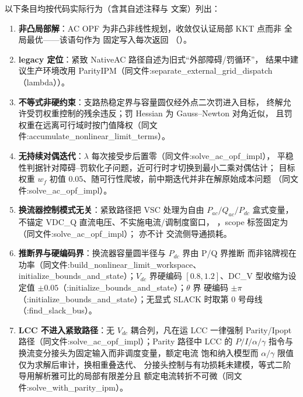 以下条目均按代码实际行为（含其自述注释与  文案）列出：
\begin{enumerate}
  \item \textbf{非凸局部解}：AC OPF 为非凸非线性规划，收敛仅认证局部 KKT 点而非
        全局最优——该语句作为  固定写入每次返回
        （）。
  \item \textbf{legacy 定位}：紧致 NativeAC 路径自述为旧式``外部障碍/罚循环''，
        结果中建议生产环境改用 ParityIPM（同文件:separate\_external\_grid\_dispatch（lambda））。
  \item \textbf{不等式非硬约束}：支路热稳定界与容量圆仅经外点二次罚进入目标，
        终解允许受罚权重控制的残余违反；罚 Hessian 为 Gauss--Newton 对角近似，
        且罚权重在远离可行域时按门值降权（同文件:accumulate\_nonlinear\_limit\_terms）。
  \item \textbf{无持续对偶迭代}：$\lambda$ 每次接受步后置零（同文件:solve\_ac\_opf\_impl），
        平稳性判据针对障碍--罚软化子问题，近可行时才切换到最小二乘对偶估计；
        目标权重 $w_f$ 初值 0.05、随可行性爬坡，前中期迭代并非在解原始成本问题
        （同文件:solve\_ac\_opf\_impl）。
  \item \textbf{换流器控制模式无关}：紧致路径把 VSC 处理为自由 $P_{ac}/Q_{ac}/P_{dc}$
        盒式变量，不锚定 VDC\_Q 直流电压、不实施电流/调制度窗口，
        ，scope 标签固定为
        （同文件:solve\_ac\_opf\_impl）；
        亦不计  交流侧导通损耗。
  \item \textbf{推断界与硬编码界}：换流器容量圆半径与 $P_{dc}$ 界由 P/Q 界推断
        而非铭牌视在功率（同文件:build\_nonlinear\_limit\_workspace、initialize\_bounds\_and\_state）；$V_{dc}$ 界硬编码
        $[0.8,1.2]$、DC\_V 型收缩为设定值 $\pm0.05$（:initialize\_bounds\_and\_state）；$\theta$ 界
        硬编码 $\pm\pi$（:initialize\_bounds\_and\_state）；无显式 SLACK 时取第 0 号母线（:find\_slack\_bus）。
  \item \textbf{LCC 不进入紧致路径}：无 $V_{dc}$ 耦合列，凡在运 LCC 一律强制
        Parity/Ipopt 路径（同文件:solve\_ac\_opf\_impl）；Parity 路径中 LCC 的
        $P/I/\alpha/\gamma$ 指令与换流变分接头为固定输入而非调度变量，额定电流
        饱和纳入模型而 $\alpha/\gamma$ 限值仅为求解后审计，换相重叠迭代、
        分接头控制与有功损耗未建模，等式二阶导用解析雅可比的局部有限差分且
        额定电流转折不可微（同文件:solve\_with\_parity\_ipm）。

\end{enumerate}
